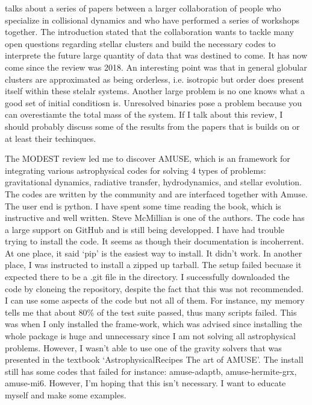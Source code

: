     \citet{2018ComAC...5....2V} talks about a series of papers between a larger collaboration of people who specialize in collisional dynamics and who have performed a series of workshops together. The introduction stated that the collaboration wants to tackle many open questions regarding stellar clusters and build the necessary codes to interprete the future large quantity of data that was destined to come. It has now come since the review was 2018. An interesting point was that in general globular clusters are approximated as being orderless, i.e. isotropic but order does present itself within these stelalr systems. Another large problem is no one knows what a good set of initial conditiosn is. Unresolved binaries pose a problem because you can overestiamte the total mass of the system. If I talk about this review, I should probably discuss some of the results from the papers that is builds on or at least their techinques.

    The MODEST review led me to discover AMUSE, which is an framework for integrating various astrophysical codes for solving 4 types of problems: gravitational dynamics, radiative transfer, hydrodynamics, and stellar evolution. The codes are written by the community and are interfaced together with Amuse. The user end is python. I have spent some time reading the book, which is instructive and well written. Steve McMillian is one of the authors. The code has a large support on GitHub and is still being developped. I have had trouble trying to install the code. It seems as though their documentation is incoherrent. At one place, it said `pip' is the easiest way to install. It didn't work. In another place, I was instructed to install a zipped up tarball. The setup failed becuase it expected there to be a .git file in the directory. I successfully downloaded the code by cloneing the repository, despite the fact that this was not recommended. I can use some aspects of the code but not all of them. For instance, my memory tells me that about 80\% of the test suite passed, thus many scripts failed. This was when I only installed the frame-work, which was advised since installing the whole package is huge and unnecessary since I am not solving all astrophysical problems. However, I wasn't able to use one of the gravity solvers that was presented in the textbook `AstrophysicalRecipes The art of AMUSE'. The install still has some codes that failed for instance: amuse-adaptb, amuse-hermite-grx, amuse-mi6. However, I'm hoping that this isn't necessary. I want to educate myself and make some examples. 

